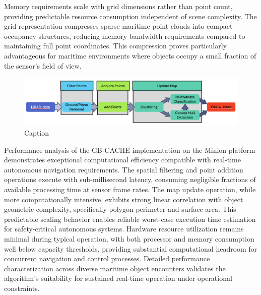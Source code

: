 \documentclass{erauthesis}
\begin{document}
Memory requirements scale with grid dimensions rather than point count, providing predictable resource consumption independent of scene complexity.
The grid representation compresses sparse maritime point clouds into compact occupancy structures, reducing memory bandwidth requirements compared to maintaining full point coordinates.
This compression proves particularly advantageous for maritime environments where objects occupy a small fraction of the sensor's field of view.

\begin{figure}
    \centering
    \includegraphics[width=0.95\linewidth]{Images/gbcache_flow.png}
    \caption{Caption}
    \label{fig:gbcache_flow}
\end{figure}

Performance analysis of the \ac{GB-CACHE} implementation on the Minion platform demonstrates exceptional computational efficiency compatible with real-time autonomous navigation requirements.
The spatial filtering and point addition operations execute with sub-millisecond latency, consuming negligible fractions of available processing time at sensor frame rates.
The map update operation, while more computationally intensive, exhibits strong linear correlation with object geometric complexity, specifically polygon perimeter and surface area.
This predictable scaling behavior enables reliable worst-case execution time estimation for safety-critical autonomous systems.
Hardware resource utilization remains minimal during typical operation, with both processor and memory consumption well below capacity thresholds, providing substantial computational headroom for concurrent navigation and control processes.
Detailed performance characterization across diverse maritime object encounters validates the algorithm's suitability for sustained real-time operation under operational constraints.
\end{document}
